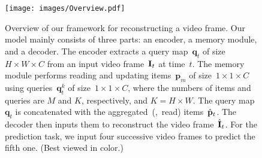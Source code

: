 \documentclass[10pt,twocolumn,letterpaper]{article}
\begin{document}
	\begin{figure}[t]
		\centering
		\texttt{[image: images/Overview.pdf]}
\vspace{-0.2cm}
		\caption{Overview of our framework for reconstructing a video frame. Our model mainly consists of three parts: an encoder, a memory module, and a decoder. The encoder extracts a query map~$\mathbf{q}_t$ of size~$H\times W \times C$ from an input video frame~${\bf{I}}_t$ at time~$t$. The memory module performs reading and updating items~$\mathbf{p}_m$ of size~$1\times 1\times C$ using queries~$\mathbf{q}_t^k$ of size~$1\times 1\times C$, where the numbers of items and queries are $M$ and $K$, respectively, and $K=H\times W$. The query map~$\mathbf{q}_t$ is concatenated with the aggregated~(\ie,~read) items~$\hat {\bf{p}}_t$. The decoder then inputs them to reconstruct the video frame~$\hat {\bf{I}}_t$. For the prediction task, we input four successive video frames to predict the fifth one. (Best viewed in color.)}
		\label{fig:overview}
\vspace{-0.3cm}
    \end{figure}
\end{document}
